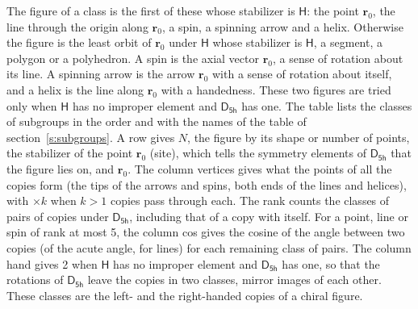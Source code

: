 \documentclass[10pt,a4paper]{article}
\numberwithin{equation}{section}
\newcommand{\grp}[1]{\mathsf{#1}}
\newcommand{\pointr}{\mathbf{r}}
\begin{document}
\leavevmode\label{n:head.figure}The figure of a class is the first of these whose stabilizer is $\grp{H}$: the point $\pointr_0$, the line through the origin along $\pointr_0$, a spin, a spinning arrow and a helix. Otherwise the figure is the least orbit of $\pointr_0$ under $\grp{H}$ whose stabilizer is $\grp{H}$, a segment, a polygon or a polyhedron. A spin is the axial vector $\pointr_0$, a sense of rotation about its line. A spinning arrow is the arrow $\pointr_0$ with a sense of rotation about itself, and a helix is the line along $\pointr_0$ with a handedness. These two figures are tried only when $\grp{H}$ has no improper element and $\grp{D_{5h}}$ has one. The table lists the classes of subgroups in the order and with the names of the table of section~\ref{s:subgroups}. \label{n:head.site}A row gives $N$, the figure by its shape or number of points, the stabilizer of the point $\pointr_0$ (site), which tells the symmetry elements of $\grp{D_{5h}}$ that the figure lies on, and $\pointr_0$. \label{n:head.vertices}The column vertices gives what the points of all the copies form (the tips of the arrows and spins, both ends of the lines and helices), with ${\times}k$ when $k > 1$ copies pass through each. \label{n:head.rank}The rank counts the classes of pairs of copies under $\grp{D_{5h}}$, including that of a copy with itself. \label{n:head.cos}For a point, line or spin of rank at most 5, the column cos gives the cosine of the angle between two copies (of the acute angle, for lines) for each remaining class of pairs. \label{n:head.hand}The column hand gives 2 when $\grp{H}$ has no improper element and $\grp{D_{5h}}$ has one, so that the rotations of $\grp{D_{5h}}$ leave the copies in two classes, mirror images of each other. These classes are the left- and the right-handed copies of a chiral figure.
\end{document}
